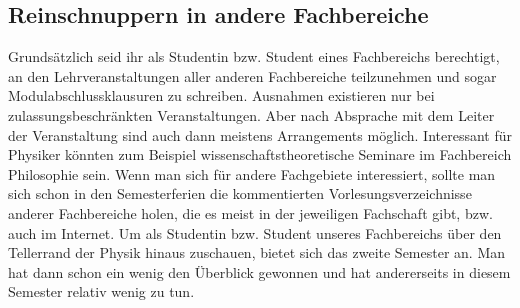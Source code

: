 \begin{multicols}{2}
\subsection*{Reinschnuppern in andere Fachbereiche}
Grundsätzlich seid ihr als Studentin bzw. Student
eines Fachbereichs berechtigt, an den Lehrveranstaltungen aller anderen Fachbereiche teilzunehmen und sogar Modulabschlussklausuren zu schreiben. Ausnahmen existieren nur bei zulassungsbeschränkten Veranstaltungen. Aber nach Absprache mit dem Leiter der Veranstaltung sind auch dann meistens Arrangements möglich. Interessant für Physiker könnten zum Beispiel wissenschaftstheoretische Seminare im Fachbereich Philosophie sein. Wenn man sich für andere Fachgebiete interessiert, sollte man sich schon  in den Semesterferien die kommentierten Vorlesungsverzeichnisse anderer Fachbereiche holen, die es meist in der jeweiligen Fachschaft gibt, bzw. auch im Internet. Um als Studentin bzw. Student unseres Fachbereichs über den Tellerrand der Physik hinaus zuschauen, bietet sich das zweite Semester an. Man hat dann schon ein wenig den Überblick gewonnen und hat andererseits in diesem Semester relativ wenig zu tun.

\end{multicols}
